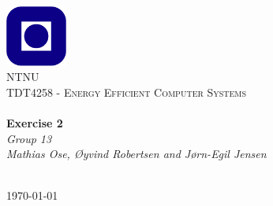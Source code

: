 \begin{titlepage}
\begin{center}
\includegraphics[width=0.15\textwidth]{img/ntnulogo.PNG}~\\[1cm]

\textsc{\LARGE NTNU}\\[1.5cm]

\textsc{\Large TDT4258 - Energy Efficient Computer Systems}\\[0.5cm]

\HRule \\[0.4cm]
{ \huge \bfseries Exercise 2}\\[0.5cm]
{\Large \textit{Group 13}}\\[0.3cm]
{\large \textit{Mathias Ose, \O yvind Robertsen and J\o rn-Egil Jensen}}\\[0.2cm]
\HRule \\[1.5cm]



\vfill

{\large \today}
\end{center}
\end{titlepage}
